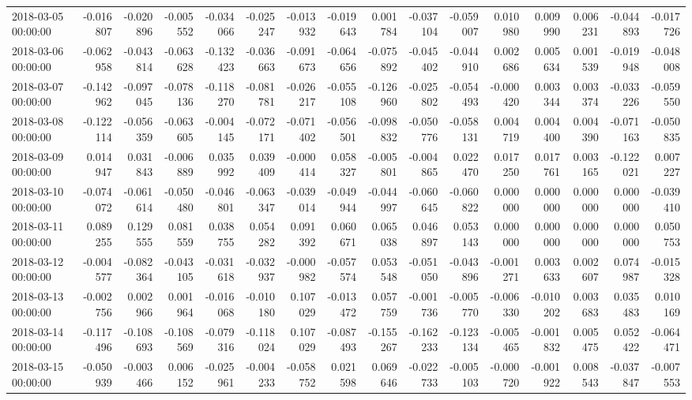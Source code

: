 \begin{tabular}{lrrrrrrrrrrrrrrr}
2018-03-05 00:00:00 & -0.016807 & -0.020896 & -0.005552 & -0.034066 & -0.025247 & -0.013932 & -0.019643 & 0.001784 & -0.037104 & -0.059007 & 0.010980 & 0.009990 & 0.006231 & -0.044893 & -0.017726 \\
2018-03-06 00:00:00 & -0.062958 & -0.043814 & -0.063628 & -0.132423 & -0.036663 & -0.091673 & -0.064656 & -0.075892 & -0.045402 & -0.044910 & 0.002686 & 0.005634 & 0.001539 & -0.019948 & -0.048008 \\
2018-03-07 00:00:00 & -0.142962 & -0.097045 & -0.078136 & -0.118270 & -0.081781 & -0.026217 & -0.055108 & -0.126960 & -0.025802 & -0.054493 & -0.000420 & 0.003344 & 0.003374 & -0.033226 & -0.059550 \\
2018-03-08 00:00:00 & -0.122114 & -0.056359 & -0.063605 & -0.004145 & -0.072171 & -0.071402 & -0.056501 & -0.098832 & -0.050776 & -0.058131 & 0.004719 & 0.004400 & 0.004390 & -0.071163 & -0.050835 \\
2018-03-09 00:00:00 & 0.014947 & 0.031843 & -0.006889 & 0.035992 & 0.039409 & -0.000414 & 0.058327 & -0.005801 & -0.004865 & 0.022470 & 0.017250 & 0.017761 & 0.003165 & -0.122021 & 0.007227 \\
2018-03-10 00:00:00 & -0.074072 & -0.061614 & -0.050480 & -0.046801 & -0.063347 & -0.039014 & -0.049944 & -0.044997 & -0.060645 & -0.060822 & 0.000000 & 0.000000 & 0.000000 & 0.000000 & -0.039410 \\
2018-03-11 00:00:00 & 0.089255 & 0.129555 & 0.081559 & 0.038755 & 0.054282 & 0.091392 & 0.060671 & 0.065038 & 0.046897 & 0.053143 & 0.000000 & 0.000000 & 0.000000 & 0.000000 & 0.050753 \\
2018-03-12 00:00:00 & -0.004577 & -0.082364 & -0.043105 & -0.031618 & -0.032937 & -0.000982 & -0.057574 & 0.053548 & -0.051050 & -0.043896 & -0.001271 & 0.003633 & 0.002607 & 0.074987 & -0.015328 \\
2018-03-13 00:00:00 & -0.002756 & 0.002966 & 0.001964 & -0.016068 & -0.010180 & 0.107029 & -0.013472 & 0.057759 & -0.001736 & -0.005770 & -0.006330 & -0.010202 & 0.003683 & 0.035483 & 0.010169 \\
2018-03-14 00:00:00 & -0.117496 & -0.108693 & -0.108569 & -0.079316 & -0.118024 & 0.107029 & -0.087493 & -0.155267 & -0.162233 & -0.123134 & -0.005465 & -0.001832 & 0.005475 & 0.052422 & -0.064471 \\
2018-03-15 00:00:00 & -0.050939 & -0.003466 & 0.006152 & -0.025961 & -0.004233 & -0.058752 & 0.021598 & 0.069646 & -0.022733 & -0.005103 & -0.000720 & -0.001922 & 0.008543 & -0.037847 & -0.007553 \\

\end{tabular}
